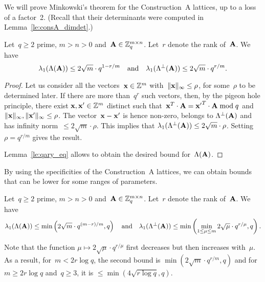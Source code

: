 We will prove Minkowski's theorem for the Construction~A lattices, up to a loss of a factor~2. (Recall that their determinants were computed in Lemma~\ref{le:consA_dimdet}.)

\begin{lemma}
\label{le:Minko_constA}
Let~$q\geq 2$ prime, $m>n>0$ and~${\bf A} \in \mathbb{Z}_q^{m \times n}$. Let~$r$ 
denote the rank of~${\bf A}$. 
We have 
\[
\lambda_1( \Lambda({\bf A}))  \leq 
 2\sqrt{m}  \cdot  q^{1-r/m} \ \  \mbox{ and } \ \ 
\lambda_1 (\Lambda^{\perp}({\bf A})) \leq  2 \sqrt{m} \cdot  q^{r/m}.
\]
\end{lemma}


\begin{proof}
 Let us consider all the vectors~${\bf x} \in \mathbb{Z}^m$ with~$\|{\bf x}\|_\infty \leq \rho$, for some~$\rho$ to be determined later. If there are more than~$q^r$ such vectors, then, by the pigeon hole principle,  
there exist ${\bf x}, {\bf x}' \in \mathbb{Z}^m$ distinct such that~${\bf x}^T \cdot {\bf A} =  {\bf x'}^T \cdot {\bf A} \bmod q$ and~$\|{\bf x}\|_\infty,\|{\bf x}'\|_\infty \leq \rho$. The vector~${\bf x} - {\bf x}'$ is hence non-zero, belongs to $\Lambda^{\perp}({\bf A})$ and has infinity norm~$\leq 2 \sqrt{m} \cdot \rho$. This implies that  $\lambda_1(\Lambda^{\perp}({\bf A})) \leq 2 \sqrt{m} \cdot  \rho$. 
Setting~$\rho = q^{r/m}$ gives the result. 

Lemma~\ref{le:qary_eq} allows to obtain the desired bound for~$\Lambda({\bf A})$.
\end{proof}

By using the specificities of the Construction~A lattices, we can obtain bounds that can be lower for some ranges of parameters. 

\begin{lemma}
\label{le:Minko_constA_optimized}
Let~$q\geq 2$ prime, $m>n>0$ and~${\bf A} \in \mathbb{Z}_q^{m \times n}$. Let~$r$ 
denote the rank of~${\bf A}$. 
We have 
\[
\lambda_1( \Lambda({\bf A}))  \leq 
 \min \left( 2\sqrt{m}  \cdot  q^{(m-r)/m}, q \right) \ \  \mbox{ and } \ \ 
\lambda_1 (\Lambda^{\perp}({\bf A})) \leq  \min\left( \min_{1 \leq  \mu \leq m} 2 \sqrt{\mu} \cdot  q^{r/\mu}, q\right).
\]
\end{lemma}

Note that the function $\mu \mapsto 2 \sqrt{\mu} \cdot  q^{r/\mu}$ first decreases but then increases with~$\mu$. As a result, 
for~$m < 2 r \log q$, the second bound is $\min(2 \sqrt{m} \cdot  q^{r/m}, q)$ and for $m \geq 2 r \log q$ and~$q \geq 3$, 
it is $\leq \min(4\sqrt{r \log q}, q)$.

